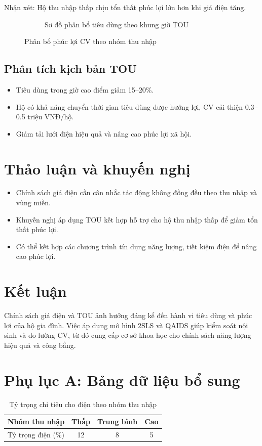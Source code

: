 \documentclass[12pt,a4paper]{article}
\begin{document}
	Nhận xét: Hộ thu nhập thấp chịu tổn thất phúc lợi lớn hơn khi giá điện tăng.  
	
	\begin{figure}[H]
		\centering
		\begin{figure}[H]
			\centering
			\caption{Sơ đồ phân bổ tiêu dùng theo khung giờ TOU}
		\end{figure}
		
		\caption{Phân bố phúc lợi CV theo nhóm thu nhập}
		\label{fig:cv_income}
	\end{figure}
	
	\subsection{Phân tích kịch bản TOU}
	\begin{itemize}
		\item Tiêu dùng trong giờ cao điểm giảm 15–20\%.
		\item Hộ có khả năng chuyển thời gian tiêu dùng được hưởng lợi, CV cải thiện 0.3–0.5 triệu VNĐ/hộ.
		\item Giảm tải lưới điện hiệu quả và nâng cao phúc lợi xã hội.
	\end{itemize}
	
	\section{Thảo luận và khuyến nghị}
	\begin{itemize}
		\item Chính sách giá điện cần cân nhắc tác động không đồng đều theo thu nhập và vùng miền.
		\item Khuyến nghị áp dụng TOU kết hợp hỗ trợ cho hộ thu nhập thấp để giảm tổn thất phúc lợi.
		\item Có thể kết hợp các chương trình tín dụng năng lượng, tiết kiệm điện để nâng cao phúc lợi.
	\end{itemize}
	
	\section{Kết luận}
	Chính sách giá điện và TOU ảnh hưởng đáng kể đến hành vi tiêu dùng và phúc lợi của hộ gia đình. Việc áp dụng mô hình 2SLS và QAIDS giúp kiểm soát nội sinh và đo lường CV, từ đó cung cấp cơ sở khoa học cho chính sách năng lượng hiệu quả và công bằng.
	
	\newpage
	\appendix
	\section{Phụ lục A: Bảng dữ liệu bổ sung}
	\begin{table}[H]
		\centering
		\caption{Tỷ trọng chi tiêu cho điện theo nhóm thu nhập}
		\begin{tabular}{lccc}
			\toprule
			Nhóm thu nhập & Thấp & Trung bình & Cao \\
			\midrule
			Tỷ trọng điện (\%) & 12 & 8 & 5 \\
			\bottomrule
		\end{tabular}
	\end{table}
	
\end{document}
